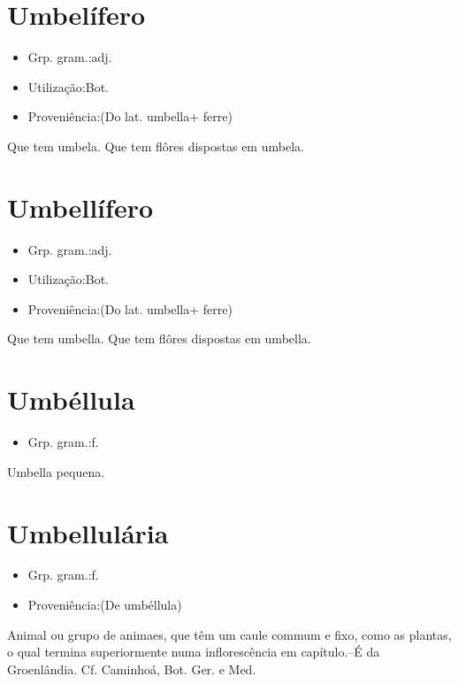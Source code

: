 \documentclass{article}
\begin{document}
\section{Umbelífero}
\begin{itemize}
\item {Grp. gram.:adj.}
\end{itemize}
\begin{itemize}
\item {Utilização:Bot.}
\end{itemize}
\begin{itemize}
\item {Proveniência:(Do lat. \textunderscore umbella\textunderscore  + \textunderscore ferre\textunderscore )}
\end{itemize}
Que tem umbela.
Que tem flôres dispostas em umbela.
\section{Umbellífero}
\begin{itemize}
\item {Grp. gram.:adj.}
\end{itemize}
\begin{itemize}
\item {Utilização:Bot.}
\end{itemize}
\begin{itemize}
\item {Proveniência:(Do lat. \textunderscore umbella\textunderscore  + \textunderscore ferre\textunderscore )}
\end{itemize}
Que tem umbella.
Que tem flôres dispostas em umbella.
\section{Umbéllula}
\begin{itemize}
\item {Grp. gram.:f.}
\end{itemize}
Umbella pequena.
\section{Umbellulária}
\begin{itemize}
\item {Grp. gram.:f.}
\end{itemize}
\begin{itemize}
\item {Proveniência:(De \textunderscore umbéllula\textunderscore )}
\end{itemize}
Animal ou grupo de animaes, que têm um caule commum e fixo, como as plantas, o qual termina superiormente numa inflorescência em capítulo.--É da Groenlândia. Cf. Caminhoá, \textunderscore Bot. Ger. e Med.\textunderscore 
\end{document}
